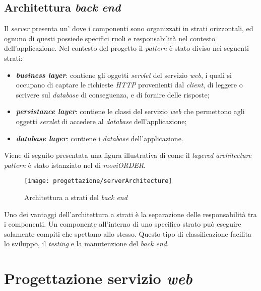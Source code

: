 \subsection{Architettura \textit{back end}}

Il \textit{server} presenta un' dove i componenti sono organizzati in strati orizzontali, ed ognuno di questi possiede specifici ruoli e responsabilità nel contesto dell'applicazione. Nel contesto del progetto il \textit{pattern} è stato diviso nei seguenti strati:
\begin{itemize}
	\item \textbf{\textit{business layer}}: contiene gli oggetti \textit{servlet} del servizio \textit{web}, i quali si occupano di captare le richieste \textit{HTTP} provenienti dal \textit{client}, di leggere o scrivere sul \textit{database} di conseguenza, e di fornire delle risposte;
	\item \textbf{\textit{persistance layer}}: contiene le classi del servizio \textit{web} che permettono agli oggetti \textit{servlet} di accedere al \textit{database} dell'applicazione;
	\item \textbf{\textit{database layer}}: contiene i \textit{database} dell'applicazione.
\end{itemize}

\newpage

Viene di seguito presentata una figura illustrativa di come il \textit{layered architecture pattern} è stato istanziato nel  di \textit{moviORDER}. 

\begin{figure}[!h] 
    \centering 
    \texttt{[image: progettazione/serverArchitecture]} 
    \caption{Architettura a strati del \textit{back end}}
\end{figure}

Uno dei vantaggi dell'architettura a strati è la separazione delle responsabilità tra i componenti. Un componente all'interno di uno specifico strato può eseguire solamente compiti che spettano allo stesso. Questo tipo di classificazione facilita lo sviluppo, il \textit{testing} e la manutenzione del \textit{back end}.

\newpage

\section{Progettazione servizio \textit{web}}

